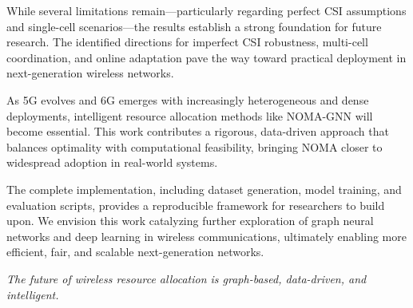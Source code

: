 While several limitations remain—particularly regarding perfect CSI assumptions and single-cell scenarios—the results establish a strong foundation for future research. The identified directions for imperfect CSI robustness, multi-cell coordination, and online adaptation pave the way toward practical deployment in next-generation wireless networks.

As 5G evolves and 6G emerges with increasingly heterogeneous and dense deployments, intelligent resource allocation methods like NOMA-GNN will become essential. This work contributes a rigorous, data-driven approach that balances optimality with computational feasibility, bringing NOMA closer to widespread adoption in real-world systems.

The complete implementation, including dataset generation, model training, and evaluation scripts, provides a reproducible framework for researchers to build upon. We envision this work catalyzing further exploration of graph neural networks and deep learning in wireless communications, ultimately enabling more efficient, fair, and scalable next-generation networks.

\vspace{1cm}

\begin{center}
\textit{The future of wireless resource allocation is graph-based, data-driven, and intelligent.}
\end{center}
